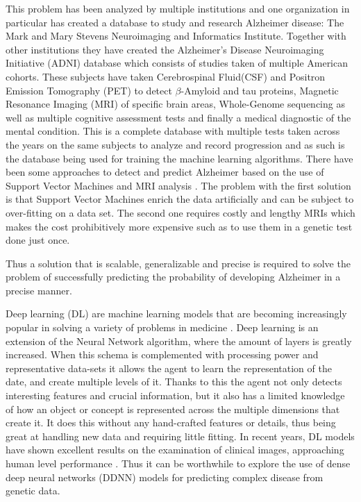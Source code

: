This problem has been analyzed by multiple institutions and one organization in particular has created a database to study and research Alzheimer disease: The Mark and Mary Stevens Neuroimaging and Informatics Institute. Together with other institutions they have created the Alzheimer’s Disease Neuroimaging Initiative (ADNI) database \cite{MarkandMaryStevensNeuroImagingInstitute} which consists of studies taken of multiple American cohorts. These subjects have taken Cerebrospinal Fluid(CSF) and Positron Emission Tomography (PET) to detect $\beta$-Amyloid and tau proteins, Magnetic Resonance Imaging (MRI) of specific brain areas, Whole-Genome sequencing as well as multiple cognitive assessment tests and finally a medical diagnostic of the mental condition. This is a complete database with multiple tests taken across the years on the same subjects to analyze and record progression and as such is the database being used for training the machine learning algorithms. 
\newpage
There have been some approaches to detect and predict Alzheimer based on the use of Support Vector Machines \cite{Orru2012} and MRI analysis \cite{Kloppel2008}\cite{Long2017}. The problem with the first solution is that Support Vector Machines enrich the data artificially and can be subject to over-fitting on a data set. The second one requires costly and lengthy MRIs which makes the cost prohibitively more expensive such as to use them in a genetic test done just once.

Thus a solution that is scalable, generalizable and precise is required to solve the problem of successfully predicting the probability of developing Alzheimer in a precise manner.

Deep learning (DL) are machine learning models that are becoming increasingly popular in solving a variety of problems in medicine \cite{LeCun2017}.  Deep learning is an extension of the Neural Network algorithm, where the amount of layers is greatly increased. When this schema is complemented with processing power and representative data-sets it allows the agent to learn the representation of the date, and create multiple levels of it. Thanks to this the agent not only detects interesting features and crucial information, but it also has a limited knowledge of how an object or concept is represented across the multiple dimensions that create it. It does this without any hand-crafted features or details, thus being great at handling new data and requiring little fitting. In recent years, DL models have shown excellent results on the examination of clinical images, approaching human level performance \cite{Esteva2017}. Thus it can be worthwhile to explore the use of dense deep neural networks (DDNN) models for predicting complex disease from genetic data.

